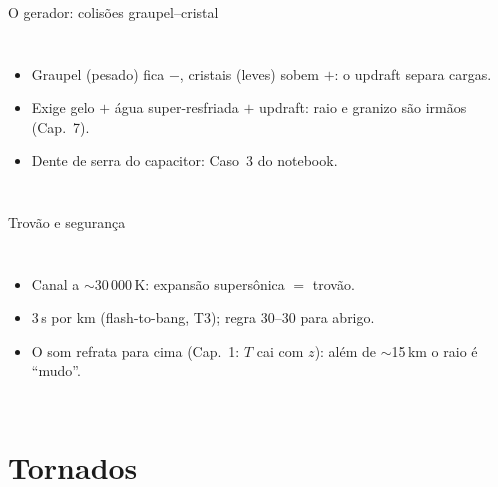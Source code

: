 \documentclass[aspectratio=169,11pt]{beamer}
\begin{document}
\begin{frame}{O gerador: colisões graupel--cristal}
  \begin{columns}
    \begin{itemize}
      \item Graupel (pesado) fica $-$, cristais (leves) sobem $+$:
            o updraft separa cargas.
      \item Exige gelo $+$ água super-resfriada $+$ updraft: raio e
            granizo são irmãos (Cap.~7).
      \item Dente de serra do capacitor: Caso~3 do notebook.
    \end{itemize}
  \end{columns}
\end{frame}

\begin{frame}{Trovão e segurança}
  \begin{columns}
    \begin{itemize}
      \item Canal a $\sim$30\,000\,K: expansão supersônica $=$
            trovão.
      \item \alert{3\,s por km} (flash-to-bang, T3); regra 30--30
            para abrigo.
      \item O som refrata para cima (Cap.~1: $T$ cai com $z$): além
            de $\sim$15\,km o raio é ``mudo''.
    \end{itemize}
  \end{columns}
\end{frame}

\section{Tornados}
\end{document}
